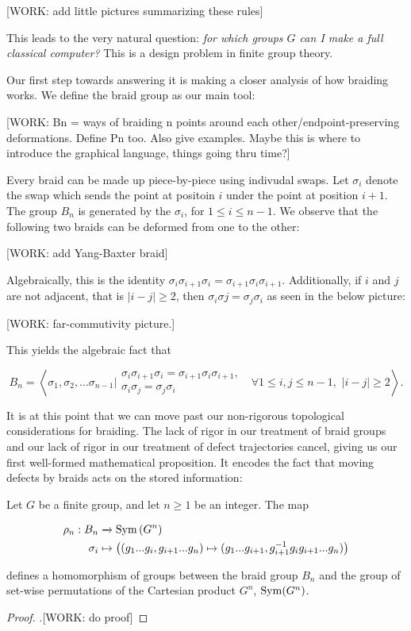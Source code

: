 [WORK: add little pictures summarizing these rules]

This leads to the very natural question: \textit{for which groups $G$ can I make a full classical computer?} This is a design problem in finite group theory.

Our first step towards answering it is making a closer analysis of how braiding works. We define the braid group as our main tool:

[WORK: Bn = ways of braiding n points around each other/endpoint-preserving deformations. Define Pn too. Also give examples. Maybe this is where to introduce the graphical language, things going thru time?]

Every braid can be made up piece-by-piece using indivudal swaps. Let $\sigma_{i}$ denote the swap which sends the point at positoin $i$ under the point at position $i+1$. The group $B_n$ is generated by the $\sigma_i$, for $1\leq i \leq n-1$. We observe that the following two braids can be deformed from one to the other:

[WORK: add Yang-Baxter braid]

Algebraically, this is the identity $\sigma_{i}\sigma_{i+1}\sigma_{i}=\sigma_{i+1}\sigma_{i}\sigma_{i+1}$. Additionally, if $i$ and $j$ are not adjacent, that is $|i-j|\geq 2$, then $\sigma_{i}\sigma{j}=\sigma_j\sigma_i$ as seen in the below picture:

[WORK: far-commutivity picture.]

This yields the algebraic fact that

$$B_n=\left<\left.\sigma_1,\sigma_2,...\sigma_{n-1}\right| \substack{\sigma_{i}\sigma_{i+1}\sigma_{i}=\sigma_{i+1}\sigma_{i}\sigma_{i+1}, \\ \sigma_i\sigma_j=\sigma_j\sigma_i}\,\,\,\,\forall 1\leq i,j \leq n-1,\,\, |i-j|\geq 2\right>.$$

It is at this point that we can move past our non-rigorous topological considerations for braiding. The lack of rigor in our treatment of braid groups and our lack of rigor in our treatment of defect trajectories cancel, giving us our first well-formed mathematical proposition. It encodes the fact that moving defects by braids acts on the stored information:

\begin{proposition} Let $G$ be a finite group, and let $n\geq 1$ be an integer. The map

\begin{align*}
\rho_n: B_n &\xrightarrow{} \operatorname{Sym}\left(G^n\right)\\
\sigma_i &\mapsto \left((g_1... g_i, g_{i+1} ... g_n)\mapsto (g_1... g_{i+1}, g_{i+1}^{-1}g_i g_{i+1} ... g_n) \right)
\end{align*}

defines a homomorphism of groups between the braid group $B_n$ and the group of set-wise permutations of the Cartesian product $G^n$, $\operatorname{Sym}(G^n)$.
\end{proposition}
\begin{proof}.[WORK: do proof]
\end{proof}

